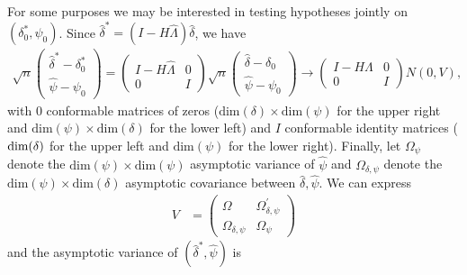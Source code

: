 \documentclass[12pt]{article}
\begin{document}
For some purposes we may be interested in testing hypotheses jointly on $\left(\delta_{0}^{*},\psi_{0}\right)$.
Since $\widehat{\delta}^{*}=(I-H\widehat{\Lambda})\widehat{\delta}$, we have
\begin{align*}
\sqrt{n}\begin{pmatrix}\widehat{\delta}^{*}-\delta_{0}^{*}\\
\widehat{\psi}-\psi_{0}
\end{pmatrix}=\begin{pmatrix}I-H\widehat{\Lambda} & 0\\
0 & I
\end{pmatrix}\sqrt{n}\begin{pmatrix}\widehat{\delta}-\delta_{0}\\
\widehat{\psi}-\psi_{0}
\end{pmatrix}\to\begin{pmatrix}I-H\Lambda & 0\\
0 & I
\end{pmatrix}N(0,V),
\end{align*}
with $0$ conformable matrices of zeros ($\text{dim}(\delta)\times\text{dim}(\psi)$
for the upper right and $\text{dim}(\psi)\times\text{dim}(\delta)$
for the lower left) and $I$ conformable identity matrices ($\text{dim\ensuremath{\left(\delta\right)}}$
for the upper left and $\text{dim}\left(\psi\right)$ for the lower
right). Finally, let $\Omega_{\psi}$ denote the $\text{dim}(\psi)\times\text{dim}(\psi)$
asymptotic variance of $\widehat{\psi}$ and $\Omega_{\delta,\psi}$
denote the $\text{dim}(\psi)\times\text{dim}(\delta)$ asymptotic
covariance between $\widehat{\delta},\widehat{\psi}$. We can express
\begin{align*}
V & =\begin{pmatrix}\Omega & \Omega_{\delta,\psi}^{\prime}\\
\Omega_{\delta,\psi} & \Omega_{\psi}
\end{pmatrix}
\end{align*}
and the asymptotic variance of $\left(\widehat{\delta}^{*},\widehat{\psi}\right)$ is
\end{document}
